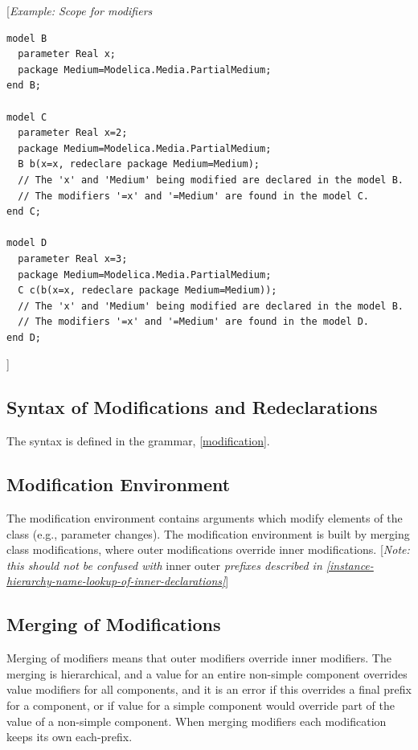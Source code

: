 \documentclass[10pt,a4paper]{report}
\def\doublelabel#1{\label{#1}\hypertarget{#1}{}}
\begin{document}
{[}\emph{Example: Scope for modifiers}
\begin{lstlisting}[language=modelica]
model B
  parameter Real x;
  package Medium=Modelica.Media.PartialMedium;
end B;

model C
  parameter Real x=2;
  package Medium=Modelica.Media.PartialMedium;
  B b(x=x, redeclare package Medium=Medium);
  // The 'x' and 'Medium' being modified are declared in the model B.
  // The modifiers '=x' and '=Medium' are found in the model C.
end C;

model D
  parameter Real x=3;
  package Medium=Modelica.Media.PartialMedium;
  C c(b(x=x, redeclare package Medium=Medium));
  // The 'x' and 'Medium' being modified are declared in the model B.
  // The modifiers '=x' and '=Medium' are found in the model D.
end D;
\end{lstlisting}

{]}

\subsection{Syntax of Modifications and Redeclarations}\doublelabel{syntax-of-modifications-and-redeclarations}

The syntax is defined in the grammar, \ref{modification}.

\subsection{Modification Environment}\doublelabel{modification-environment}

The modification environment contains arguments which modify elements of
the class (e.g., parameter changes). The modification environment is
built by merging class modifications, where outer modifications override
inner modifications. {[}\emph{Note: this should not be confused with}
inner outer \emph{prefixes described in \ref{instance-hierarchy-name-lookup-of-inner-declarations}}{]}

\subsection{Merging of Modifications}\doublelabel{merging-of-modifications}

Merging of modifiers means that outer modifiers override inner
modifiers. The merging is hierarchical, and a value for an entire
non-simple component overrides value modifiers for all components, and
it is an error if this overrides a final prefix for a component, or if
value for a simple component would override part of the value of a
non-simple component. When merging modifiers each modification keeps its
own each-prefix.
\end{document}
